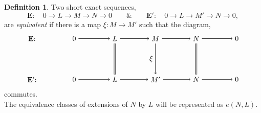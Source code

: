 \documentclass[11.5pt, twoside, a4paper, titlepage]{report}
\theoremstyle{definition}
\newtheorem{mydef}{Definition}[section]
\theoremstyle{plain}
\begin{document}
\begin{mydef}
Two short exact sequences,
\begin{equation*}
\mathbf{E}: \quad 0\xrightarrow{}L\xrightarrow{}M\xrightarrow{}N\xrightarrow{}0 \qquad \& \qquad \mathbf{E'}: \quad 0\xrightarrow{}L\xrightarrow{}M'\xrightarrow{}N\xrightarrow{}0 ,
\end{equation*}
are \emph{equivalent} if there is a map $\xi: M \to M'$ such that the diagram,
\begin{equation*}
\begin{tikzpicture}[->,-latex, auto, main path/.style={->, semithick}, main node/.style={}]
\node	[main node]		(1) at (0,0)		{$\mathbf{E}$: \quad };
\node	[main node]		(2) at (2,0)		{$0$};
\node	[main node]		(3) at (4,0)		{$L$};
\node [main node]		(4) at (6,0)		{$M$};
\node [main node]		(5) at (8,0)		{$N$};
\node	[main node]		(11) at (10,0)	{$0$};

\node	[main node]		(6) at (0,-2)		{$\mathbf{E'}$: \quad};
\node	[main node]		(7) at (2,-2)		{$0$};
\node	[main node]		(8) at (4,-2)		{$L$};
\node [main node]		(9) at (6,-2)		{$M'$};
\node [main node]		(10) at (8,-2)	{$N$};
\node [main node]		(13) at (10,-2)	{$0$};

\draw (2) edge [main path] node [auto] {$$} (3);
\draw (3) edge [main path] node [auto] {$$} (4);
\draw (4) edge [main path] node [auto] {$$} (5);
\draw (5) edge [main path] (11);

\draw (7) edge [main path] node [auto] {$$} (8);
\draw (8) edge [main path] node [auto] {$$} (9);
\draw (9) edge [main path] node [auto] {$$} (10);
\draw (10) edge [main path] (13);

\draw (3) edge [-, semithick, double, double distance=1.5pt] (8);
\draw (4) edge [main path] node [auto, swap] {$\xi$} (9);
\draw (5) edge [-, semithick, double, double distance=1.5pt](10);
\end{tikzpicture}
\end{equation*}
commutes.\\
The equivalence classes of extensions of $N$ by $L$ will be represented as $e(N,L)$.
\end{mydef}
\end{document}
